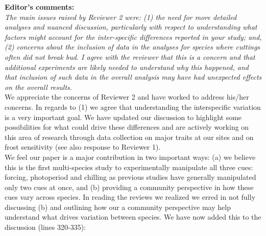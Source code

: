 \documentclass[11pt,a4paper]{article}
\begin{document}


{\bf Editor's comments:} \\

\emph{The main issues raised by Reviewer 2 were: (1) the need for more detailed analyses and
nuanced discussion, particularly with respect to understanding what factors might account for
the inter-specific differences reported in your study; and, (2) concerns about the inclusion
of data in the analyses for species where cuttings often did not break bud.  I agree with the
reviewer that this is a concern and that additional experiments are likely needed to
understand why this happened, and that inclusion of such data in the overall analysis may
have had unexpected effects on the overall results.}\\

We appreciate the concerns of Reviewer 2 and have worked to address his/her concerns. In regards to (1) we agree that understanding the interspecific variation is a very important goal. We have updated our discussion to highlight some possibilities for what could drive these differences and are  actively working on this area of research through data collection on major traits at our sites and on frost sensitivity (see also response to Reviewer 1). \\

We feel our paper is a major contribution in two important ways: (a) we believe this is the first multi-species study to experimentally manipulate all three cues: forcing, photoperiod and chilling as previous studies have generally manipulated only two cues at once, and (b) providing a community perspective in how these cues vary across species. In reading the reviews we realized we erred in not fully discussing (b) and outlining how our a community perspective may help understand what drives variation between species. We have now added this to the discussion (lines 320-335):
\end{document}
